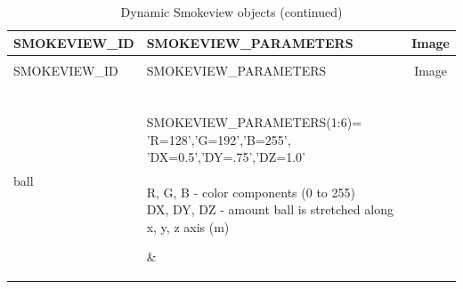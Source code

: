 \begin{longtable}[ht]{|l|l|c|}
\caption{Dynamic Smokeview objects}
\label{tab:devices_dynamic}
\\ \hline
{\ct SMOKEVIEW\_ID}  & {\ct SMOKEVIEW\_PARAMETERS} & Image  \\ \hline \hline
\endfirsthead
\caption{Dynamic Smokeview objects (continued)}
\\ \hline
{\ct SMOKEVIEW\_ID}  & {\ct SMOKEVIEW\_PARAMETERS} & Image  \\ \hline \hline
\endhead

{\ct ball} &
\parbox[c]{\boxwidth}{
\hspace{1in} \\
{\ct SMOKEVIEW\_PARAMETERS(1:6)=}\\
{\ct 'R=128','G=192','B=255',}\\
{\ct 'DX=0.5','DY=.75','DZ=1.0'}\\  \\
{\ct R, G, B} - color components (0 to 255) \\
{\ct DX, DY, DZ} - amount ball is stretched along x, y, z axis (m) \\
\hspace{1in} } &
 \\ \hline

{\ct cone} &
\parbox[c]{\boxwidth}{
\hspace{1in} \\
{\ct SMOKEVIEW\_PARAMETERS(1:5)=}\\
{\ct 'R=128','G=255','B=192',}\\
{\ct 'D=0.4','H=0.6'}\\ \\
{\ct R, G, B} - color components (0 to 255) \\
{\ct D, H} - diameter and height (m) \\
\hspace{1in}
} &
 \\ \hline


\end{longtable}
